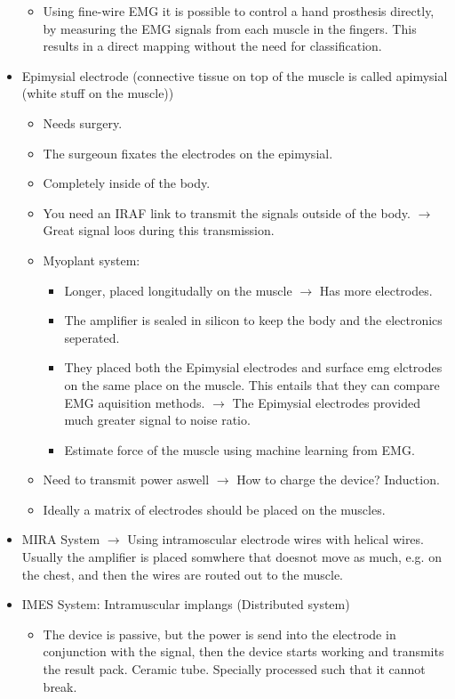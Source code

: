 \documentclass[a4paper]{article}
\begin{document}
\begin{itemize}
\begin{itemize}
	\item Using fine-wire EMG it is possible to control a hand prosthesis directly, by measuring the EMG signals from each muscle in the fingers. This results in a direct mapping without the need for classification. 
	\end{itemize}
\item Epimysial electrode (connective tissue on top of the muscle is called apimysial (white stuff on the muscle)) 
	\begin{itemize}
		\item Needs surgery.
		\item The surgeoun fixates the electrodes on the epimysial.  
		\item Completely inside of the body. 
		\item You need an IRAF link to transmit the signals outside of the body. $ \rightarrow $ Great signal loos during this transmission. 
		\item Myoplant system:
			\begin{itemize}
				\item Longer, placed longitudally on the muscle $ \rightarrow $ Has more electrodes. 
				\item The amplifier is sealed in silicon to keep the body and the electronics seperated. 
				\item They placed both the Epimysial electrodes and surface emg elctrodes on the same place on the muscle. This entails that they can compare EMG aquisition methods. $ \rightarrow $ The Epimysial electrodes provided much greater signal to noise ratio. 
				\item Estimate force of the muscle using machine learning from EMG. 
			\end{itemize}
		\item Need to transmit power aswell $ \rightarrow $ How to charge the device? Induction. 
		\item Ideally a matrix of electrodes should be placed on the muscles.
	\end{itemize}
\item MIRA System $ \rightarrow $  Using intramoscular electrode wires with helical wires. Usually the amplifier is placed somwhere that doesnot move as much, e.g. on the chest, and then the wires are routed out to the muscle. 
\item IMES System: Intramuscular implangs (Distributed system)
	\begin{itemize}
		\item The device is passive, but the power is send into the electrode in conjunction with the signal, then the device starts working and transmits the result pack. Ceramic tube. Specially processed such that it cannot break.

\end{itemize}
\end{itemize}
\end{document}
